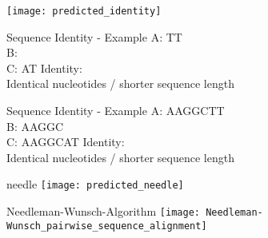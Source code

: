 \begin{frame}[c]{}
    \center
    \texttt{[image: predicted\_identity]}
\end{frame}


\begin{frame}[c]{Sequence Identity - Example}
    A: \only<4-5>{AAGGC}TT \\
    B:  \\
    C: AT \newline
    \newline
    Identity:  \\
    Identical nucleotides / shorter sequence length
\end{frame}


\begin{frame}[c]{Sequence Identity - Example}
    A: {\color{ForestGreen}AAGGC}{\color{red}T}{\color{ForestGreen}T} \\
    B: AAGGC \\
    C: {\color{ForestGreen}AAGGC}{\color{red}A}{\color{ForestGreen}T} \newline
    \newline
    Identity:  \\
    Identical nucleotides / shorter sequence length
\end{frame}


\begin{frame}[c]{needle}
    \center
    \texttt{[image: predicted\_needle]}
\end{frame}

\begin{frame}[c]{Needleman-Wunsch-Algorithm}
    \center
    \texttt{[image: Needleman-Wunsch\_pairwise\_sequence\_alignment]}
\end{frame}











